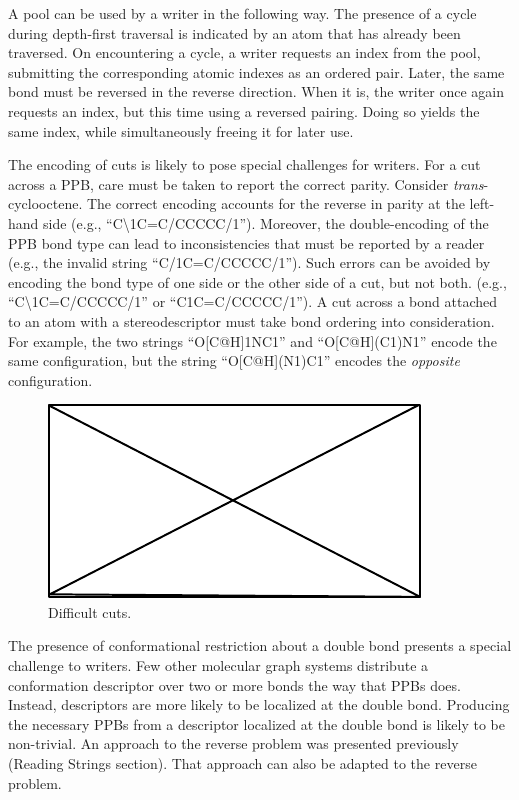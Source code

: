 \documentclass{article}
\begin{document}
A pool can be used by a writer in the following way. The presence of a cycle during depth-first traversal is indicated by an atom that has already been traversed. On encountering a cycle, a writer requests an index from the pool, submitting the corresponding atomic indexes as an ordered pair. Later, the same bond must be reversed in the reverse direction. When it is, the writer once again requests an index, but this time using a reversed pairing. Doing so yields the same index, while simultaneously freeing it for later use.

The encoding of cuts is likely to pose special challenges for writers. For a cut across a PPB, care must be taken to report the correct parity. Consider \textit{trans}-cyclooctene. The correct encoding accounts for the reverse in parity at the left-hand side (e.g., \enquote{C{\textbackslash}1C=C/CCCCC/1}). Moreover, the double-encoding of the PPB bond type can lead to inconsistencies that must be reported by a reader (e.g., the invalid string \enquote{C/1C=C/CCCCC/1}). Such errors can be avoided by encoding the bond type of one side or the other side of a cut, but not both. (e.g., \enquote{C{\textbackslash}1C=C/CCCCC/1} or \enquote{C1C=C/CCCCC/1}). A cut across a bond attached to an atom with a stereodescriptor must take bond ordering into consideration. For example, the two strings \enquote{O[C@H]1NC1} and \enquote{O[C@H](C1)N1} encode the same configuration, but the string \enquote{O[C@H](N1)C1} encodes the \textit{opposite} configuration. 

\begin{figure}
    \centering
    \includegraphics{filler}
    \caption{Difficult cuts.}
    \label{fig:difficult-cuts}
\end{figure}

The presence of conformational restriction about a double bond presents a special challenge to writers. Few other molecular graph systems distribute a conformation descriptor over two or more bonds the way that PPBs does. Instead, descriptors are more likely to be localized at the double bond. Producing the necessary PPBs from a descriptor localized at the double bond is likely to be non-trivial. An approach to the reverse problem was presented previously (Reading Strings section). That approach can also be adapted to the reverse problem.
\end{document}
